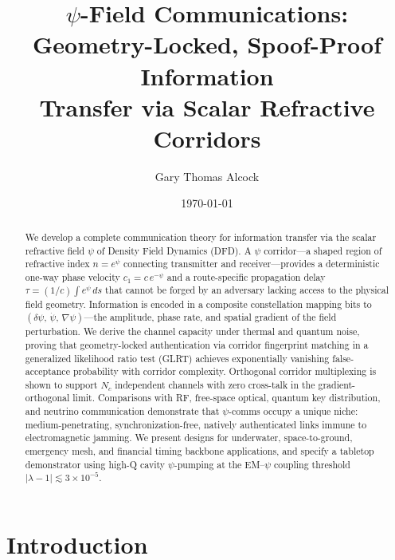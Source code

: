 \documentclass[twocolumn,superscriptaddress,prd,nofootinbib]{revtex4-2}
\begin{document}
\title{$\psi$-Field Communications: Geometry-Locked, Spoof-Proof Information\\
Transfer via Scalar Refractive Corridors}

\author{Gary Thomas Alcock}

\date{\today}

\begin{abstract}
We develop a complete communication theory for information transfer via
the scalar refractive field $\psi$ of Density Field Dynamics (DFD).
A $\psi$ corridor---a shaped region of refractive index
$n = e^\psi$ connecting transmitter and receiver---provides a
deterministic one-way phase velocity $c_1 = c\,e^{-\psi}$ and a
route-specific propagation delay
$\tau = (1/c)\int e^\psi\,ds$ that cannot be forged by an adversary
lacking access to the physical field geometry.
Information is encoded in a composite constellation mapping bits to
$(\delta\psi,\,\dot{\psi},\,\nabla\psi)$---the amplitude, phase rate,
and spatial gradient of the field perturbation.
We derive the channel capacity under thermal and quantum noise,
proving that geometry-locked authentication via corridor fingerprint
matching in a generalized likelihood ratio test (GLRT) achieves
exponentially vanishing false-acceptance probability with corridor
complexity.
Orthogonal corridor multiplexing is shown to support $N_c$ independent
channels with zero cross-talk in the gradient-orthogonal limit.
Comparisons with RF, free-space optical, quantum key distribution, and
neutrino communication demonstrate that $\psi$-comms occupy a unique
niche: medium-penetrating, synchronization-free, natively authenticated
links immune to electromagnetic jamming.
We present designs for underwater, space-to-ground, emergency mesh,
and financial timing backbone applications, and specify a tabletop
demonstrator using high-Q cavity $\psi$-pumping at the EM--$\psi$
coupling threshold $|\lambda - 1| \lesssim 3 \times 10^{-5}$.
\end{abstract}

\maketitle
\tableofcontents

\section{Introduction}\label{sec:intro}
\end{document}
